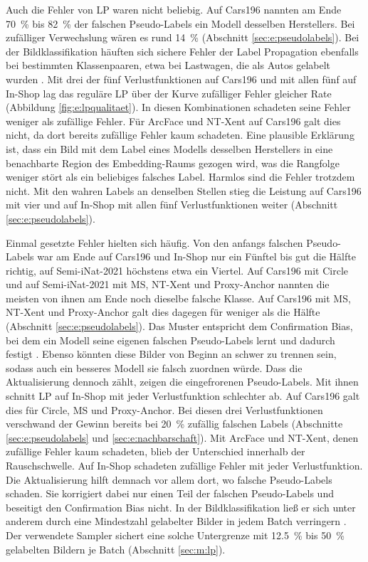 Auch die Fehler von \ac{LP} waren nicht beliebig. Auf Cars196 nannten am Ende \qty{70}{\percent} bis \qty{82}{\percent} der falschen Pseudo-Labels ein Modell desselben Herstellers. Bei zufälliger Verwechslung wären es rund \qty{14}{\percent} (Abschnitt \ref{sec:e:pseudolabels}). Bei der Bildklassifikation häuften sich sichere Fehler der Label Propagation ebenfalls bei bestimmten Klassenpaaren, etwa bei Lastwagen, die als Autos gelabelt wurden \cite{iscen_label_2019}. Mit drei der fünf Verlustfunktionen auf Cars196 und mit allen fünf auf In-Shop lag das reguläre \ac{LP} über der Kurve zufälliger Fehler gleicher Rate (Abbildung \ref{fig:e:lpqualitaet}). In diesen Kombinationen schadeten seine Fehler weniger als zufällige Fehler. Für ArcFace und \ac{NT-Xent} auf Cars196 galt dies nicht, da dort bereits zufällige Fehler kaum schadeten. Eine plausible Erklärung ist, dass ein Bild mit dem Label eines Modells desselben Herstellers in eine benachbarte Region des Embedding-Raums gezogen wird, was die Rangfolge weniger stört als ein beliebiges falsches Label. Harmlos sind die Fehler trotzdem nicht. Mit den wahren Labels an denselben Stellen stieg die Leistung auf Cars196 mit vier und auf In-Shop mit allen fünf Verlustfunktionen weiter (Abschnitt \ref{sec:e:pseudolabels}).

Einmal gesetzte Fehler hielten sich häufig. Von den anfangs falschen Pseudo-Labels war am Ende auf Cars196 und In-Shop nur ein Fünftel bis gut die Hälfte richtig, auf Semi-iNat-2021 höchstens etwa ein Viertel. Auf Cars196 mit Circle und auf Semi-iNat-2021 mit \ac{MS}, \ac{NT-Xent} und Proxy-Anchor nannten die meisten von ihnen am Ende noch dieselbe falsche Klasse. Auf Cars196 mit \ac{MS}, \ac{NT-Xent} und Proxy-Anchor galt dies dagegen für weniger als die Hälfte (Abschnitt \ref{sec:e:pseudolabels}). Das Muster entspricht dem Confirmation Bias, bei dem ein Modell seine eigenen falschen Pseudo-Labels lernt und dadurch festigt \cite{arazo_2020}. Ebenso könnten diese Bilder von Beginn an schwer zu trennen sein, sodass auch ein besseres Modell sie falsch zuordnen würde. Dass die Aktualisierung dennoch zählt, zeigen die eingefrorenen Pseudo-Labels. Mit ihnen schnitt \ac{LP} auf In-Shop mit jeder Verlustfunktion schlechter ab. Auf Cars196 galt dies für Circle, \ac{MS} und Proxy-Anchor. Bei diesen drei Verlustfunktionen verschwand der Gewinn bereits bei \qty{20}{\percent} zufällig falschen Labels (Abschnitte \ref{sec:e:pseudolabels} und \ref{sec:e:nachbarschaft}). Mit ArcFace und \ac{NT-Xent}, denen zufällige Fehler kaum schadeten, blieb der Unterschied innerhalb der Rauschschwelle. Auf In-Shop schadeten zufällige Fehler mit jeder Verlustfunktion. Die Aktualisierung hilft demnach vor allem dort, wo falsche Pseudo-Labels schaden. Sie korrigiert dabei nur einen Teil der falschen Pseudo-Labels und beseitigt den Confirmation Bias nicht. In der Bildklassifikation ließ er sich unter anderem durch eine Mindestzahl gelabelter Bilder in jedem Batch verringern \cite{arazo_2020}. Der verwendete Sampler sichert eine solche Untergrenze mit \qty{12.5}{\percent} bis \qty{50}{\percent} gelabelten Bildern je Batch (Abschnitt \ref{sec:m:lp}). 

